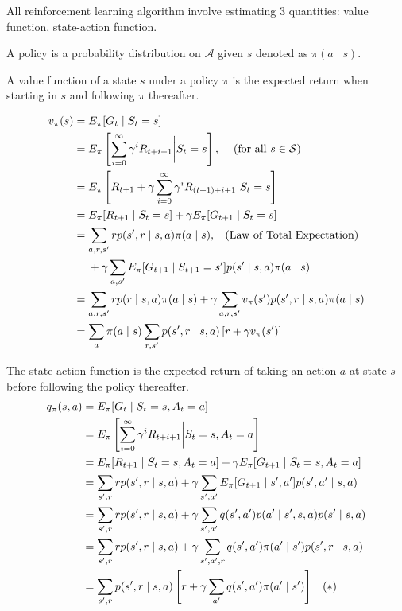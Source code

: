 \documentclass[twocolumn, 10pt]{article}
\newcommand{\actionset}{ \mathcal{A}}
\newcommand{\stateset}{\mathcal{S}}
\newcommand{\Mid}{ \bigg|}
\begin{document}
All reinforcement learning algorithm involve estimating 3 quantities: value function, state-action function.

A policy is a probability distribution on $\actionset$ given $s$ denoted as  $\pi (a \mid s)$.

A value function of a state $s$ under a policy $\pi$ is the expected return when starting in  $s$ and following $\pi$ thereafter.

$$ 
\begin{aligned}
v_{\pi}(s) &= E_{\pi} [G_t \mid S_t = s]  \\
                 &=  E_{\pi} \left[ \sum^{\infty}_{i=0}  \gamma^i R_{t + i + 1} \Mid S_t = s \right],  \hspace{2ex} \mbox{ (for all } s \in \stateset)  \\
                 &=  E_{\pi} \left[ R_{t+1} + \gamma \sum^{\infty}_{i=0} \gamma^i R_{(t+1) + i + 1} \Mid S_t = s \right] \\
                 &=  E_{\pi} [ R_{t+1} \mid S_t = s]  + \gamma  E_{\pi} [ G_{t+1} \mid S_t = s ] \\
                 &=  \sum_{a, r, s'} r p(s',  r \mid s , a) \pi(a \mid s) , \hspace{2ex} \mbox{(Law of Total Expectation)} \\ 
                 &\hspace{3ex} +  \gamma  \sum_{a, s'} E_{\pi}[G_{t + 1} \mid S_{t+1} = s'] p(s' \mid s, a)  \pi (a \mid s)  \\
                 &=  \sum_{a, r, s'} r p( r \mid s , a) \pi(a \mid s)  +  \gamma  \sum_{a, r, s'} v_{\pi}(s')  p(s'
                 , r \mid s, a)  \pi (a \mid s)  \\
                 &= \sum_{a} \pi(a \mid s)  \sum_{r, s'}   p(s', r \mid s, a)   \left[ r  + \gamma  v_{\pi}(s')  \right]
\end{aligned}
$$

The state-action function is the expected return  of taking an action $a$ at state $s$ before following the policy thereafter.
$$
\begin{aligned}
 q_{\pi}(s, a) &= E_{\pi} [G_t \mid S_t = s, A_t = a]  \\
             &= E_{\pi} \left[ \sum^{\infty}_{i=0}  \gamma^i R_{t + i + 1}  \Mid S_t = s , A_t = a\right]  \\
             &= E_{\pi} [R_{t+1} \mid S_t = s, A_t =  a] + \gamma E_{\pi} [ G_{t+1} \mid S_t = s, A_t =  a] \\
             &=  \sum_{s', r} r p(s', r  \mid s, a) + \gamma \sum_{s', a'} E_{\pi} [G_{t+1} \mid s', a'] p(s', a' \mid s, a) \\
             &=  \sum_{s', r} r p(s', r  \mid s, a) + \gamma \sum_{s', a'} q(s', a') p( a' \mid s',  s, a) p(s' \mid  s, a) \\
             &=  \sum_{s', r} r p(s', r  \mid s, a) + \gamma \sum_{s', a', r} q(s', a') \pi(a' \mid s')  p(s', r \mid  s, a) \\
             &=  \sum_{s', r}  p(s', r  \mid s, a) \left [ r + \gamma \sum_{a'} q(s', a') \pi(a' \mid s')  \right]   \hspace{2ex} (*) 
 \end{aligned}
$$
\end{document}

